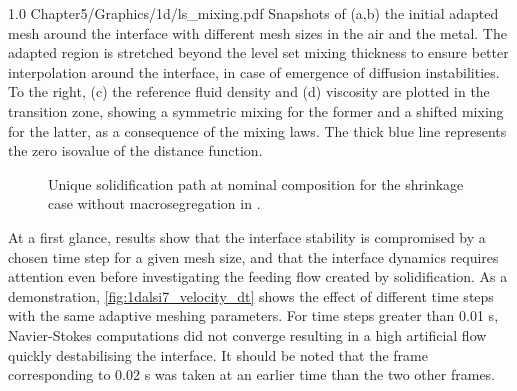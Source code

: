 \begin{figureth}
{1.0}
{Chapter5/Graphics/1d/ls_mixing.pdf}
{Snapshots of (a,b) the initial adapted mesh around the interface with different mesh sizes in the air and the metal. The adapted region
is stretched beyond the level set mixing thickness to ensure better interpolation around the interface, in case of emergence of diffusion
instabilities. To the right, (c)  the reference fluid density and (d) viscosity are plotted in the transition zone, showing a symmetric mixing for the former
and a shifted mixing for the latter, as a consequence of the mixing laws.
The thick blue line represents the zero isovalue of the distance function.}
\label{fig:1dalsi7_lsmixing}
\end{figureth}

\begin{figure}[htbp]
\centering
{}

\caption{Unique solidification path at nominal composition for the shrinkage case without macrosegregation in .}
\label{fig:shrinkage_nomacro_sp}
\end{figure}

At a first glance, results show that the interface stability is compromised by a chosen time step for a given mesh size, and that the interface dynamics
requires attention even before investigating the feeding flow created by solidification. As a demonstration, \cref{fig:1dalsi7_velocity_dt} shows the effect of different
time steps with the same adaptive meshing parameters. For time steps greater than 0.01 s, Navier-Stokes computations did not converge resulting in a high artificial 
flow quickly destabilising the interface. It should be noted that the frame corresponding to 0.02 s was taken at an earlier time than the two other frames.

